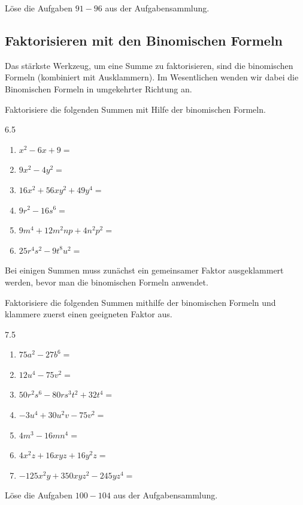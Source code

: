 \documentclass[11pt,oneside]{article}
\begin{document}
    \begin{aufgabe}
        Löse die Aufgaben $91-96$ aus der Aufgabensammlung.
    \end{aufgabe}

\subsection{Faktorisieren mit den Binomischen Formeln}
    Das stärkste Werkzeug, um eine Summe zu faktorisieren, sind die binomischen Formeln (kombiniert mit Ausklammern). Im Wesentlichen wenden wir dabei die Binomischen Formeln in umgekehrter Richtung an.
    \begin{beispiel} Faktorisiere die folgenden Summen mit Hilfe der binomischen Formeln.
    	\begin{gridspace}{6.5}
    		\begin{enumerate}[label=\alph*)]
    			\item $x^{2}-6x+9 =$
    			\item $9x^{2}-4y^{2} =$
    			\item $16x^{2}+56xy^{2}+49y^{4} =$
    			\item $9r^{2}-16s^{6} =$
    			\item $9m^{4}+12m^{2}np+4n^{2}p^{2} =$
    			\item $25r^{4}s^{2}-9t^{8}u^{2} =$
    		\end{enumerate}
    	\end{gridspace}
    \end{beispiel}
    Bei einigen Summen muss zunächst ein gemeinsamer Faktor ausgeklammert werden, bevor man die binomischen Formeln anwendet.
    \begin{beispiel}
        Faktorisiere die folgenden Summen mithilfe der binomischen Formeln und klammere zuerst einen geeigneten Faktor aus.
        \begin{gridspace}{7.5}
        	\begin{enumerate}[label=\alph*)]
        		\item $75a^{2}-27b^{6} =$
        		\item $12u^{4}-75v^{2} =$
        		\item $50r^{2}s^{6}-80rs^{3}t^{2}+32t^{4} =$
        		\item $-3u^{4}+30u^{2}v-75v^{2} =$
        		\item $4m^{3}-16mn^{4} =$
        		\item $4x^{2}z+16xyz+16y^{2}z =$
        		\item $-125x^{2}y+350xyz^{2}-245yz^{4} =$
        	\end{enumerate}
        \end{gridspace}
    \end{beispiel}
    \begin{aufgabe}
        Löse die Aufgaben $100-104$ aus der Aufgabensammlung.
    \end{aufgabe}
\end{document}

